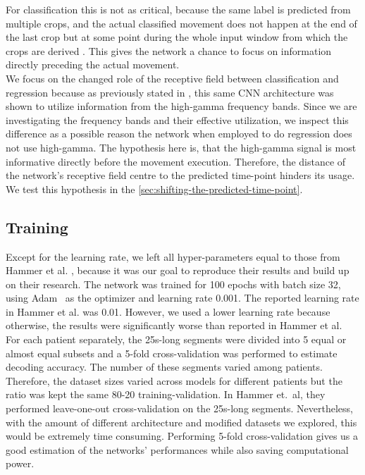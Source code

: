 For classification this is not as critical, because the same label is predicted from multiple crops, and the actual classified movement does not happen at the end of the last crop but at some point during the whole input window from which the crops are derived \cite{schirrmeister-deep-2017}.
This gives the network a chance to focus on information directly preceding the actual movement. \\

We focus on the changed role of the receptive field between classification and regression because as previously stated in \cite{schirrmeister-deep-2017, hartmann-hierarchical-2018}, this same CNN architecture was shown to utilize information from the high-gamma frequency bands. 
Since we are investigating the frequency bands and their effective utilization, we inspect this difference as a possible reason the network when employed to do regression does not use high-gamma.
The hypothesis here is, that the high-gamma signal is most informative directly before the movement execution.
Therefore, the distance of the network's receptive field centre to the predicted time-point hinders its usage.
We test this hypothesis in the \cref{sec:shifting-the-predicted-time-point}.

\subsection{Training}\label{subsec:training}
Except for the learning rate, we left all hyper-parameters equal to those from Hammer et al. \cite{Hammer-2021}, because it was our goal to reproduce their results and build up on their research.
The network was trained for 100 epochs with batch size 32, using Adam~\cite{kingma-adam-2017} as the optimizer and learning rate 0.001.
The reported learning rate in Hammer et al. was 0.01.
However, we used a lower learning rate because otherwise, the results were significantly worse than reported in Hammer et al. \\

For each patient separately, the 25s-long segments were divided into 5 equal or almost equal subsets and a 5-fold cross-validation was performed to estimate decoding accuracy.
The number of these segments varied among patients.
Therefore, the dataset sizes varied across models for different patients but the ratio was kept the same 80-20 training-validation.
In Hammer et.\ al, they performed leave-one-out cross-validation on the 25s-long segments.
Nevertheless, with the amount of different architecture and modified datasets we explored, this would be extremely time consuming.
Performing 5-fold cross-validation gives us a good estimation of the networks' performances while also saving computational power.

